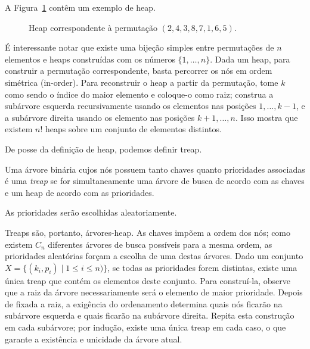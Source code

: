 A Figura~\ref{fig:heap} contêm um exemplo de heap.
\begin{figure}[h]
    \centering
    \caption{Heap correspondente à permutação $(2, 4, 3, 8, 7, 1, 6, 5)$.}
    \label{fig:heap}
\end{figure}
É interessante notar que existe uma bijeção simples entre
permutações de $n$ elementos e heaps construídas com os números $\{1, \dots, n\}$.
Dada um heap, para construir a permutação correspondente,
basta percorrer os nós em ordem simétrica (in-order).
Para reconstruir o heap a partir da permutação,
tome $k$ como sendo o índice do maior elemento e coloque-o como raiz;
construa a subárvore esquerda recursivamente
usando os elementos nas posições $1, \dots, k-1$,
e a subárvore direita usando os elemento nas posições $k+1, \dots, n$.
Isso mostra que existem $n!$ heaps sobre um conjunto de elementos distintos.

De posse da definição de heap,
podemos definir treap.

\begin{definition}
    Uma árvore binária cujos nós possuem tanto chaves quanto prioridades associadas
    é uma \emph{treap}
    se for simultaneamente uma árvore de busca de acordo com as chaves
    e um heap de acordo com as prioridades.
\end{definition}

As prioridades serão escolhidas aleatoriamente.

Treaps são, portanto, árvores-heap.
As chaves impõem a ordem dos nós;
como existem $C_n$ diferentes árvores de busca possíveis para a mesma ordem,
as prioridades aleatórias forçam a escolha de uma destas árvores.
Dado um conjunto $X = \{ (k_i, p_i) \mid 1 \leq i \leq n) \}$,
se todas as prioridades forem distintas,
existe uma única treap que contém os elementos deste conjunto.
Para construí-la,
observe que a raiz da árvore necessariamente será o elemento de maior prioridade.
Depois de fixada a raiz,
a exigência do ordenamento determina quais nós ficarão na subárvore esquerda
e quais ficarão na subárvore direita.
Repita esta construção em cada subárvore;
por indução, existe uma única treap em cada caso,
o que garante a existência e unicidade da árvore atual.

